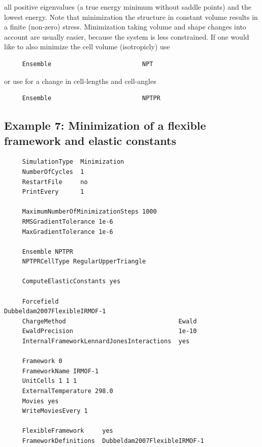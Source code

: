 all positive eigenvalues (a true energy minimum without saddle points) and the lowest energy.
Note that minimization the structure in constant volume results in a finite (non-zero) stress. Minimization taking volume and shape changes into account
are usually easier, because the system is less constrained.
If one would like to also minimize the cell volume (isotropicly) use
\begin{tiny}
\begin{verbatim}
     Ensemble                         NPT
\end{verbatim}
\end{tiny}
or use for a change in cell-lengths and cell-angles
\begin{tiny}
\begin{verbatim}
     Ensemble                         NPTPR
\end{verbatim}
\end{tiny}

\subsection*{Example 7: Minimization of a flexible framework and elastic constants}

\begin{tiny}
\begin{verbatim}
     SimulationType  Minimization
     NumberOfCycles  1
     RestartFile     no
     PrintEvery      1
     
     MaximumNumberOfMinimizationSteps 1000
     RMSGradientTolerance 1e-6
     MaxGradientTolerance 1e-6
     
     Ensemble NPTPR
     NPTPRCellType RegularUpperTriangle
     
     ComputeElasticConstants yes
     
     Forcefield                                 Dubbeldam2007FlexibleIRMOF-1
     ChargeMethod                               Ewald
     EwaldPrecision                             1e-10
     InternalFrameworkLennardJonesInteractions  yes
     
     Framework 0
     FrameworkName IRMOF-1
     UnitCells 1 1 1
     ExternalTemperature 298.0
     Movies yes
     WriteMoviesEvery 1
     
     FlexibleFramework     yes
     FrameworkDefinitions  Dubbeldam2007FlexibleIRMOF-1
\end{verbatim}
\end{tiny}

